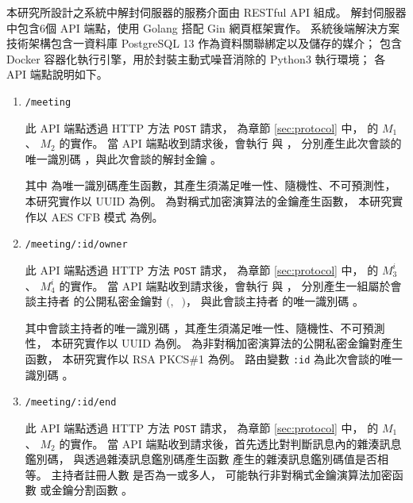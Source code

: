    本研究所設計之系統中解封伺服器的服務介面由 RESTful\cite{fielding2000architectural} API 組成。
解封伺服器 \DEFserver 中包含6個 API 端點，使用 Golang 搭配 Gin 網頁框架實作。
系統後端解決方案技術架構包含一資料庫 PostgreSQL 13 作為資料關聯綁定以及儲存的媒介；
包含 Docker 容器化執行引擎，用於封裝主動式噪音消除的 Python3 執行環境；
各 API 端點說明如下。

\begin{enumerate}
    \item \texttt{/meeting}

        此 API 端點透過 HTTP 方法 \texttt{POST} 請求，
    為章節 \ref{sec:protocol} 中，
     的 $M_{1}$ 、 $M_{2}$ 的實作。
    當 API 端點收到請求後，會執行 \DEFfuncIDgen{} 與 \DEFfuncKgen{}，
    分別產生此次會談的唯一識別碼 \DEFsessionID，與此次會談的解封金鑰 \DEFunsealKey。

        其中 \DEFfuncIDgen{} 為唯一識別碼產生函數，其產生須滿足唯一性、隨機性、不可預測性，
    本研究實作以 UUID \cite{rfc4122} 為例。
    \DEFfuncKgen{} 為對稱式加密演算法的金鑰產生函數，
    本研究實作以 AES CFB 模式 \cite{117146}\cite{9171} 為例。

    \item \texttt{/meeting/:id/owner}

        此 API 端點透過 HTTP 方法 \texttt{POST} 請求，
    為章節 \ref{sec:protocol} 中，
     的 $M_{3}^{i}$ 、 $M_{4}^{i}$ 的實作。
    當 API 端點收到請求後，會執行 \DEFfuncPKgen{} 與 \DEFfuncIDgen{}，
    分別產生一組屬於會談主持者 \DEFowner 的公開私密金鑰對 $($\DEFpublicKey$,~$ \DEFprivateKey$)$，
    與此會談主持者 \DEFowner 的唯一識別碼 \DEFownerID。

        其中會談主持者的唯一識別碼 \DEFownerID，其產生須滿足唯一性、隨機性、不可預測性，
    本研究實作以 UUID \cite{rfc4122} 為例。
    \DEFfuncPKgen{} 為非對稱加密演算法的公開私密金鑰對產生函數，
    本研究實作以 RSA PKCS\#1 \cite{rfc8017} 為例。
    路由變數 \texttt{:id} 為此次會談的唯一識別碼 \DEFsessionID。

    \item \texttt{/meeting/:id/end}

        此 API 端點透過 HTTP 方法 \texttt{POST} 請求，
    為章節 \ref{sec:protocol} 中，
     的 $M_{1}$ 、 $M_{2}$ 的實作。
    當 API 端點收到請求後，首先透比對判斷訊息內的雜湊訊息鑑別碼，
    與透過雜湊訊息鑑別碼產生函數 \DEFfuncHMAC{} 產生的雜湊訊息鑑別碼值是否相等。
    主持者註冊人數 \DEFowreg 是否為一或多人，
    可能執行非對稱式金鑰演算法加密函數 \DEFfuncEncPK{} 或金鑰分割函數 \DEFfuncSSS{}。


\end{enumerate}
